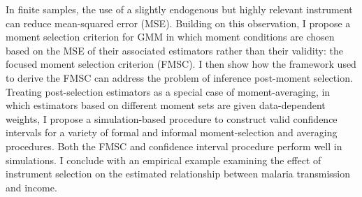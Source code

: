 In finite samples, the use of a slightly endogenous but highly relevant instrument can reduce mean-squared error (MSE). Building on this observation, I propose a moment selection criterion for GMM in which moment conditions are chosen based on the MSE of their associated estimators rather than their validity: the focused moment selection criterion (FMSC). 
I then show how the framework used to derive the FMSC can address the problem of inference post-moment selection.
Treating post-selection estimators as a special case of moment-averaging, in which estimators based on different moment sets are given data-dependent weights, I propose a simulation-based procedure to construct valid confidence intervals for a variety of formal and informal moment-selection and averaging procedures.
Both the FMSC and confidence interval procedure perform well in simulations.
I conclude with an empirical example examining the effect of instrument selection on the estimated relationship between malaria transmission and income.
